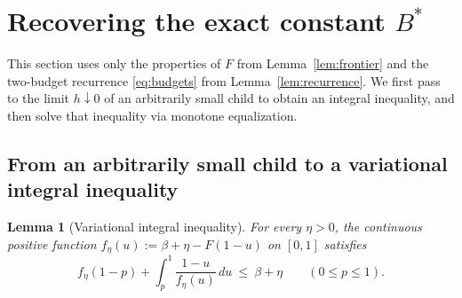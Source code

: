 \documentclass[11pt,letterpaper]{article}
\newtheorem{lemma}{Lemma}[section]
\begin{document}
\section{Recovering the exact constant \texorpdfstring{$B^*$}{B*}}\label{sec:constant}

This section uses only the properties of $F$ from Lemma~\ref{lem:frontier} and the two-budget recurrence \eqref{eq:budgets} from Lemma~\ref{lem:recurrence}. We first pass to the limit $h\downarrow 0$ of an arbitrarily small child to obtain an integral inequality, and then solve that inequality via monotone equalization.

\subsection{From an arbitrarily small child to a variational integral inequality}

\begin{lemma}[Variational integral inequality]\label{lem:variational}
For every $\eta>0$, the continuous positive function $f_\eta(u) := \beta + \eta - F(1-u)$ on $[0,1]$ satisfies
\begin{equation}\label{eq:integral}
  f_\eta(1-p) + \int_p^1 \frac{1-u}{f_\eta(u)}\,du\ \le\ \beta + \eta \qquad(0\le p\le 1).
\end{equation}
\end{lemma}
\end{document}
